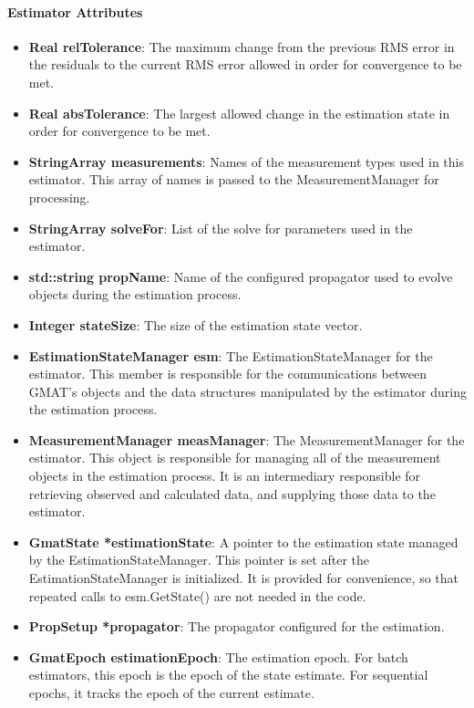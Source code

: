 \paragraph{Estimator Attributes}

\begin{itemize}
\item \textbf{Real relTolerance}:  The maximum change from the previous RMS error in the residuals to the current RMS error allowed in order for convergence to be met.
\item \textbf{Real absTolerance}:  The largest allowed change in the estimation state in order for convergence to be met.
\item \textbf{StringArray measurements}:  Names of the measurement types used in this estimator.  This array of names is passed to the MeasurementManager for processing.
\item \textbf{StringArray solveFor}:  List of the solve for parameters used in the estimator.
\item \textbf{std::string propName}:  Name of the configured propagator used to evolve objects during the estimation process.
\item \textbf{Integer stateSize}:  The size of the estimation state vector.
\item \textbf{EstimationStateManager esm}:  The EstimationStateManager for the estimator.  This member is responsible for the communications between GMAT's objects and the data structures manipulated by the estimator during the estimation process.
\item \textbf{MeasurementManager measManager}:  The MeasurementManager for the estimator.  This object is responsible for managing all of the measurement objects in the estimation process.  It is an intermediary responsible for retrieving observed and calculated data, and supplying those data to the estimator.
\item \textbf{GmatState *estimationState}:  A pointer to the estimation state managed by the EstimationStateManager.  This pointer is set after the EstimationStateManager is initialized.  It is provided for convenience, so that repeated calls to esm.GetState() are not needed in the code.
\item \textbf{PropSetup *propagator}:  The propagator configured for the estimation.
\item \textbf{GmatEpoch estimationEpoch}:  The estimation epoch.  For batch estimators, this epoch is the epoch of the state estimate.  For sequential epochs, it tracks the epoch of the current estimate.
\end{itemize}

